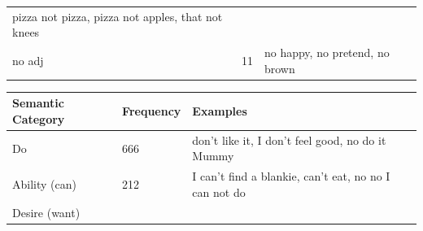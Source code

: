 \documentclass[man,floatsintext,draftall]{apa6}
\begin{document}
\begin{longtable}[]{@{}lll@{}}
\begin{minipage}[t]{0.47\columnwidth}
pizza not pizza, pizza not apples, that not knees\strut
\end{minipage}\tabularnewline
\begin{minipage}[t]{0.23\columnwidth}\raggedright\strut
no adj\strut
\end{minipage} & \begin{minipage}[t]{0.15\columnwidth}\raggedright\strut
11\strut
\end{minipage} & \begin{minipage}[t]{0.47\columnwidth}\raggedright\strut
no happy, no pretend, no brown\strut
\end{minipage}\tabularnewline
\bottomrule
\end{longtable}

\begin{longtable}[]{@{}lll@{}}
\toprule
\begin{minipage}[b]{0.27\columnwidth}\raggedright\strut
Semantic Category\strut
\end{minipage} & \begin{minipage}[b]{0.16\columnwidth}\raggedright\strut
Frequency\strut
\end{minipage} & \begin{minipage}[b]{0.39\columnwidth}\raggedright\strut
Examples\strut
\end{minipage}\tabularnewline
\midrule
\endhead
\begin{minipage}[t]{0.27\columnwidth}\raggedright\strut
Do\strut
\end{minipage} & \begin{minipage}[t]{0.16\columnwidth}\raggedright\strut
666\strut
\end{minipage} & \begin{minipage}[t]{0.39\columnwidth}\raggedright\strut
don't like it, I don't feel good, no do it Mummy\strut
\end{minipage}\tabularnewline
\begin{minipage}[t]{0.27\columnwidth}\raggedright\strut
Ability (can)\strut
\end{minipage} & \begin{minipage}[t]{0.16\columnwidth}\raggedright\strut
212\strut
\end{minipage} & \begin{minipage}[t]{0.39\columnwidth}\raggedright\strut
I can't find a blankie, can't eat, no no I can not do\strut
\end{minipage}\tabularnewline
\begin{minipage}[t]{0.27\columnwidth}\raggedright\strut
Desire (want)\strut

\end{minipage}
\end{longtable}
\end{document}
